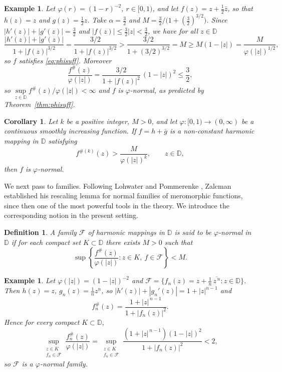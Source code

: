 \documentclass[10pt,a4paper]{amsart}
\newtheorem{corollary}[theorem]{Corollary}
\newtheorem{definition}[theorem]{Definition}
\newtheorem{example}[theorem]{Example}
\newcommand{\D}{\mathbb{D}}
\begin{document}
\begin{example}\label{ex:phisuff}
Let $\varphi(r)=(1-r)^{-2}$, $r\in[0,1)$, and let $f(z)=z+\tfrac12\bar z$, so that
$h(z)=z$ and $g(z)=\tfrac12 z$. Take $\alpha=\tfrac32$ and
$M=\tfrac32\big/\big(1+(\tfrac32)^{3/2}\big)$. Since $|h'(z)|+|g'(z)|=\tfrac32$ and
$|f(z)|\le\tfrac32|z|<\tfrac32$, we have for all $z\in\D$
\[
\frac{|h'(z)|+|g'(z)|}{1+|f(z)|^{3/2}}
=\frac{3/2}{1+|f(z)|^{3/2}}
>\frac{3/2}{1+(3/2)^{3/2}}
=M\ge M(1-|z|)=\frac{M}{\varphi(|z|)^{1/2}},
\]
so $f$ satisfies \eqref{eq:phisuff}. Moreover
\[
\frac{f^{\#}(z)}{\varphi(|z|)}=\frac{3/2}{1+|f(z)|^{2}}\,(1-|z|)^{2}\le\frac32,
\]
so $\sup\limits_{z\in\D}f^{\#}(z)/\varphi(|z|)<\infty$ and $f$ is $\varphi$-normal, as predicted by
Theorem~\ref{thm:phisuff}.
\end{example}

\begin{corollary}\label{cor:phisuff}
Let $k$ be a positive integer, $M>0$, and let $\varphi\colon[0,1)\to(0,\infty)$ be a
continuous smoothly increasing function. If $f=h+\bar g$ is a non-constant harmonic mapping
in $\D$ satisfying
\begin{equation}\label{eq:corphisuff}
f^{\#(k)}(z)>\frac{M}{\varphi(|z|)^{k}},\qquad z\in\D,
\end{equation}
then $f$ is $\varphi$-normal.
\end{corollary}

We next pass to families. Following Lohwater and Pommerenke
\cite[Theorem~1]{LohwaterPommerenke}, Zalcman \cite{Zalcman} established his rescaling lemma
for normal families of meromorphic functions, since then one of the most powerful tools in
the theory. We introduce the corresponding notion in the present setting.

\begin{definition}\label{def:phifamily}
A family $\mathcal F$ of harmonic mappings in $\D$ is said to be \emph{$\varphi$-normal} in
$\D$ if for each compact set $K\subset\D$ there exists $M>0$ such that
\[
\sup\left\{\frac{f^{\#}(z)}{\varphi(|z|)}:z\in K,\ f\in\mathcal F\right\}<M.
\]
\end{definition}

\begin{example}\label{ex:phifamily}
Let $\varphi(|z|)=(1-|z|)^{-2}$ and
$\mathcal F=\big\{f_{n}(z)=z+\tfrac1n\,\overline{z^{\,n}}:z\in\D\big\}$. Then
$h(z)=z$, $g_{n}(z)=\tfrac1n z^{n}$, so $|h'(z)|+|g_{n}'(z)|=1+|z|^{n-1}$ and
\[
f_{n}^{\#}(z)=\frac{1+|z|^{\,n-1}}{1+|f_{n}(z)|^{2}}.
\]
Hence for every compact $K\subset\D$,
\[
\sup_{\substack{z\in K\\ f_{n}\in\mathcal F}}\frac{f_{n}^{\#}(z)}{\varphi(|z|)}
=\sup_{\substack{z\in K\\ f_{n}\in\mathcal F}}
\frac{(1+|z|^{\,n-1})(1-|z|)^{2}}{1+|f_{n}(z)|^{2}}<2,
\]
so $\mathcal F$ is a $\varphi$-normal family.
\end{example}
\end{document}
